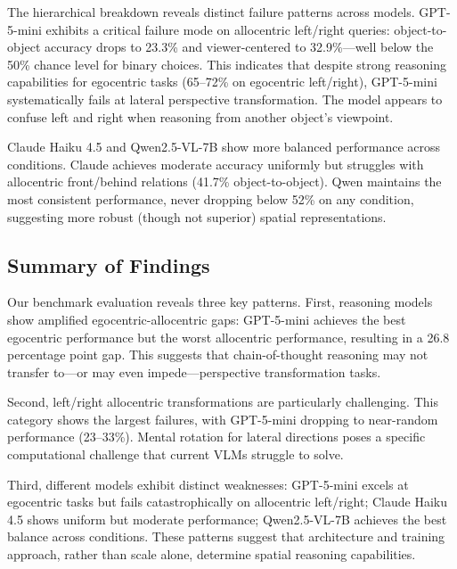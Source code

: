 The hierarchical breakdown reveals distinct failure patterns across models. GPT-5-mini exhibits a critical failure mode on allocentric left/right queries: object-to-object accuracy drops to 23.3\% and viewer-centered to 32.9\%---well below the 50\% chance level for binary choices. This indicates that despite strong reasoning capabilities for egocentric tasks (65--72\% on egocentric left/right), GPT-5-mini systematically fails at lateral perspective transformation. The model appears to confuse left and right when reasoning from another object's viewpoint.

Claude Haiku 4.5 and Qwen2.5-VL-7B show more balanced performance across conditions. Claude achieves moderate accuracy uniformly but struggles with allocentric front/behind relations (41.7\% object-to-object). Qwen maintains the most consistent performance, never dropping below 52\% on any condition, suggesting more robust (though not superior) spatial representations.

\subsection{Summary of Findings}

Our benchmark evaluation reveals three key patterns. First, reasoning models show amplified egocentric-allocentric gaps: GPT-5-mini achieves the best egocentric performance but the worst allocentric performance, resulting in a 26.8 percentage point gap. This suggests that chain-of-thought reasoning may not transfer to---or may even impede---perspective transformation tasks.

Second, left/right allocentric transformations are particularly challenging. This category shows the largest failures, with GPT-5-mini dropping to near-random performance (23--33\%). Mental rotation for lateral directions poses a specific computational challenge that current VLMs struggle to solve.

Third, different models exhibit distinct weaknesses: GPT-5-mini excels at egocentric tasks but fails catastrophically on allocentric left/right; Claude Haiku 4.5 shows uniform but moderate performance; Qwen2.5-VL-7B achieves the best balance across conditions. These patterns suggest that architecture and training approach, rather than scale alone, determine spatial reasoning capabilities.
